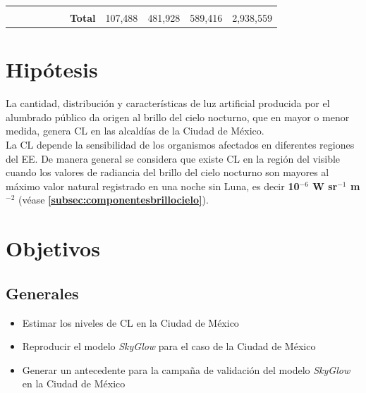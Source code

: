 \begin{landscape}
\begin{table}[]
{\begin{tabular}{llcccllcccc}
 &  & \multicolumn{1}{l}{} & \multicolumn{1}{l}{} & \multicolumn{1}{l}{} &  &  & \multicolumn{1}{l}{} & \multicolumn{1}{l}{} & \multicolumn{1}{l}{} & \multicolumn{1}{l}{} \\ \cline{7-11} 
 &  & \multicolumn{1}{l}{} & \multicolumn{1}{l}{} & \multicolumn{1}{l}{} & \multicolumn{1}{l|}{} & \multicolumn{1}{c|}{\textbf{Total}} & \multicolumn{1}{c|}{107,488} & \multicolumn{1}{c|}{481,928} & \multicolumn{1}{c|}{589,416} & \multicolumn{1}{c|}{2,938,559} \\ \cline{7-11} 
\end{tabular}
}
\end{table}
\end{landscape}

\section{Hipótesis}

\vspace{5mm}

La cantidad, distribución y características de luz artificial producida por el alumbrado público da origen al brillo del cielo nocturno, que en mayor o menor medida, genera CL en las alcaldías de la Ciudad de México.\\

La CL depende la sensibilidad de los organismos afectados en diferentes regiones del EE. De manera general se considera que existe CL en la región del visible cuando los valores de radiancia del brillo del cielo nocturno son mayores al máximo valor natural registrado en una noche sin Luna, es decir \textbf{10$^{-6}$ W sr$^{-1}$  m$^{-2}$} (véase \textbf{\autoref{subsec:componentesbrillocielo}}).\\


\section{Objetivos}

\vspace{5mm}

\subsection{Generales}

\vspace{5mm}

\begin{itemize}

	\item Estimar los niveles de CL en la Ciudad de México 

    \item Reproducir el modelo \textit{SkyGlow} para el caso de la Ciudad de México
    
    \item Generar un antecedente para la campaña de validación del modelo \textit{SkyGlow} en la Ciudad de México
    
\end{itemize}

